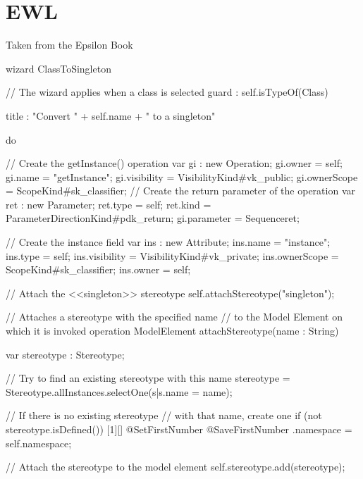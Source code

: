 \chapter{EWL}

Taken from the Epsilon Book

\begin{ewl}
wizard ClassToSingleton {
    // The wizard applies when a class is selected
    guard : self.isTypeOf(Class)
   
    title : "Convert " + self.name + " to a singleton"
   
    do {
        // Create the getInstance() operation
        var gi : new Operation;
        gi.owner = self;
        gi.name = "getInstance";
        gi.visibility = VisibilityKind#vk_public;
        gi.ownerScope = ScopeKind#sk_classifier;
        // Create the return parameter of the operation
        var ret : new Parameter;
        ret.type = self;
        ret.kind = ParameterDirectionKind#pdk_return;
        gi.parameter = Sequence{ret};
        
        // Create the instance field
        var ins : new Attribute;
        ins.name = "instance";
        ins.type = self;
        ins.visibility = VisibilityKind#vk_private;
        ins.ownerScope = ScopeKind#sk_classifier;
        ins.owner = self;
        
        // Attach the <<singleton>> stereotype
        self.attachStereotype("singleton");
    }
}
    
    
// Attaches a stereotype with the specified name
// to the Model Element on which it is invoked
operation ModelElement attachStereotype(name : String) {
    var stereotype : Stereotype;
    
    // Try to find an existing stereotype with this name
    stereotype = Stereotype.allInstances.selectOne(s|s.name = name);
    
    // If there is no existing stereotype
    // with that name, create one
    if (not stereotype.isDefined()){
        \makeatletter
        [1][]
        {\lstset{style=etl,
                #1}%
            \csname\@lst @SetFirstNumber\endcsname}
        {\csname\@lst @SaveFirstNumber\endcsname}
        \makeatotherotype.namespace = self.namespace;
    }
    
    // Attach the stereotype to the model element
    self.stereotype.add(stereotype);
}
\end{ewl}